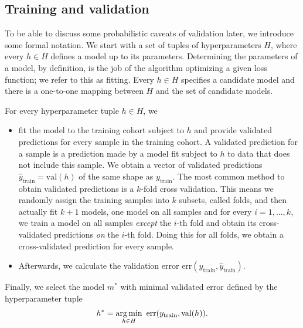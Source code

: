 \subsection{Training and validation}\label{subsec:train-val}

To be able to discuss some probabilistic caveats of validation later, we introduce some formal 
notation. We start with a set of tuples of hyperparameters $H$, where every $h \in H$ defines a model
up to its parameters. Determining the parameters of a model, by definition, is the job of the 
algorithm optimizing a given loss function; we refer to this as fitting. Every $h \in H$ specifies 
a candidate model and there is a one-to-one mapping between $H$ and the set of candidate models.

For every hyperparameter tuple $h \in H$, we
\begin{itemize}
    \item fit the model to the training cohort subject to $h$ and provide validated predictions for 
        every sample in the training cohort.
        A validated prediction for a sample is a prediction made by a model fit 
        subject to $h$ to data that does not include this sample. We obtain a vector of validated 
        predictions $\hat{y}_\text{train} = \text{val}(h)$ of the same shape as $y_\text{train}$.
        The most common method to obtain validated predictions is a $k$-fold cross validation.
        This means we randomly assign the training samples into $k$ subsets, called folds, and then actually 
        fit $k+1$ models, one model on all samples and for every $i = 1, \ldots, k$, we train a model
        on all samples \textit{except} the $i$-th fold and obtain its cross-validated predictions 
        \textit{on} the $i$-th fold. Doing this for all folds, 
        we obtain a cross-validated prediction for every sample.
    \item Afterwards, we calculate the validation error 
        $\text{err}(y_\text{train}, \hat{y}_\text{train})$.
\end{itemize}

Finally, we select the model $m^*$ with minimal validated error defined by the hyperparameter tuple 
\begin{align}
    h^* = \operatorname*{arg\,min}_{h \in H} \ \text{err}(y_\text{train}, \text{val}(h)).
\end{align}

